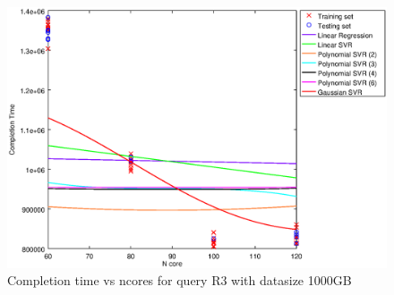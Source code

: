 
\begin {figure}[hbtp]
\centering
\includegraphics[width=\textwidth]{output/R3_1000_LINEAR_NCORE/plot_R3_1000.eps}
\caption{Completion time vs ncores for query R3 with datasize 1000GB}
\label{fig:coreonly_linear_R3_1000}
\end {figure}
